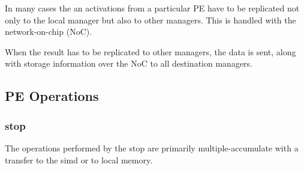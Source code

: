 \documentclass[journal]{IEEEtran}
\begin{document}

In many cases the \ac{an} activations from a particular PE have to be replicated not only to the local manager but also to other managers. This is handled with the network-on-chip (NoC).
\iffalse
The result storage directives are communicated by using the same storage descriptor mechanism. When the result has to be replicated to other managers, the storage descriptors are sent, along with the data to all destination managers.
\else
When the result has to be replicated to other managers, the data is sent, along with storage information over the NoC to all destination managers.
\fi

\subsection{PE Operations}
\label{sec:PE Operations}

\subsubsection{\acf{stop}}
\label{ssec:streamingOps}
The operations performed by the \ac{stop} are primarily multiple-accumulate with a transfer to the \ac{simd} or to local memory.

\end{document}
